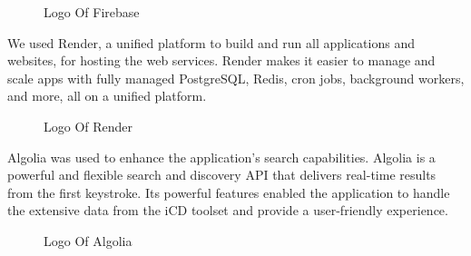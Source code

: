 \vspace{2cm}

\begin{figure}[H]
    \centering
    \caption{  Logo Of Firebase }
    \label{fig: Firebase_Logo}
\end{figure}

\newpage
We used {\color{purple}Render}, a unified platform to build and run all applications and websites, for hosting the web services. Render makes it easier to manage and scale apps with fully managed PostgreSQL, Redis, cron jobs, background workers, and more, all on a unified platform.

\begin{figure}[H]
    \centering
    \caption{  Logo Of Render }
    \label{fig: Render_Logo}
\end{figure}


{\color{purple}Algolia} was used to enhance the application's search capabilities. Algolia is a powerful and flexible search and discovery API that delivers real-time results from the first keystroke. Its powerful features enabled the application to handle the extensive data from the iCD toolset and provide a user-friendly experience.

\begin{figure}[H]
    \centering
    \caption{  Logo Of Algolia }
    \label{fig: Algolia_Logo}
\end{figure}

